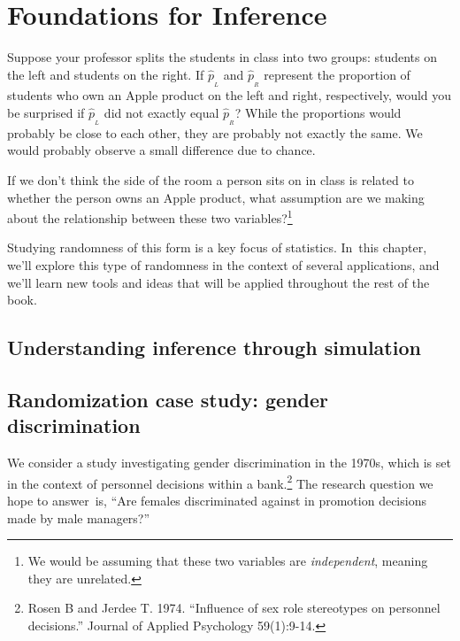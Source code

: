 \chapter{Foundations for Inference}
\label{FoundationForInference}

\begin{example}{Suppose your professor splits the students in class into two groups: students on the left and students on the right. If $\hat{p}_{_L}$ and $\hat{p}_{_R}$ represent the proportion of students who own an Apple product on the left and right, respectively, would you be surprised if $\hat{p}_{_L}$ did not {exactly} equal $\hat{p}_{_R}$?}\label{classRightLeftSideApple}
While the proportions would probably be close to each other, they are probably not exactly the same. We would probably observe a small difference due to {chance}.
\end{example}

\begin{exercise}
If we don't think the side of the room a person sits on in class is related to whether the person owns an Apple product, what assumption are we making about the relationship between these two variables?\footnote{We would be assuming that these two variables are \emph{independent}, meaning they are unrelated.}
\end{exercise}

Studying randomness of this form is a key focus of statistics. In~this chapter, we'll explore this type of randomness in the context of several applications, and we'll learn new tools and ideas that will be applied throughout the rest of the book.

\section{Understanding inference through simulation}


\section{Randomization case study: gender discrimination}
\label{caseStudyGenderDiscrimination}


We consider a study investigating gender discrimination in the 1970s, which is set in the context of personnel decisions within a bank.\footnote{Rosen B and Jerdee T. 1974. ``Influence of sex role stereotypes on personnel decisions.'' Journal of Applied Psychology 59(1):9-14.} The research question we hope to answer~is, ``Are females discriminated against in promotion decisions made by male managers?''

